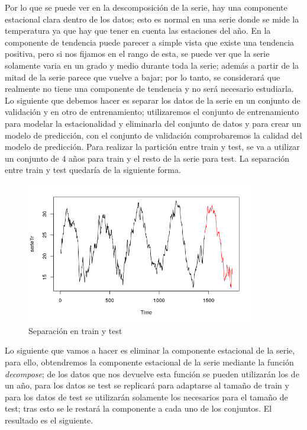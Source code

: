 Por lo que se puede ver en la descomposición de la serie, hay una componente estacional clara dentro de los datos; esto es normal en una serie donde se mide la temperatura ya que hay que tener en cuenta las estaciones del año. En la componente de tendencia puede parecer a simple vista que existe una tendencia positiva, pero si nos fijamos en el rango de esta, se puede ver que la serie solamente varia en un grado y medio durante toda la serie; además a partir de la mitad de la serie parece que vuelve a bajar; por lo tanto, se considerará que realmente no tiene una componente de tendencia y no será necesario estudiarla. Lo siguiente que debemos hacer es separar los datos de la serie en un conjunto de validación y en otro de entrenamiento; utilizaremos el conjunto de entrenamiento para modelar la estacionalidad y eliminarla del conjunto de datos y para crear un modelo de predicción, con el conjunto de validación comprobaremos la calidad del modelo de predicción. Para realizar la partición entre train y test, se va a utilizar un conjunto de 4 años para train y el resto de la serie para test.	La separación entre train y test quedaría de la siguiente forma.

\begin{figure}[H]
	\centering
	\includegraphics[width=100mm]{imagenes/traintest.png}
	\caption{Separación en train y test}
	\label{fig:6}
\end{figure}

Lo siguiente que vamos a hacer es eliminar la componente estacional de la serie, para ello, obtendremos la componente estacional de la serie mediante la función \textit{decompose}; de los datos que nos devuelve esta función se pueden utilizarán los de un año, para los datos se test se replicará para adaptarse al tamaño de train y para los datos de test se utilizarán solamente los necesarios para el tamaño de test; tras esto se le restará la componente a cada uno de los conjuntos. El resultado es el siguiente.


